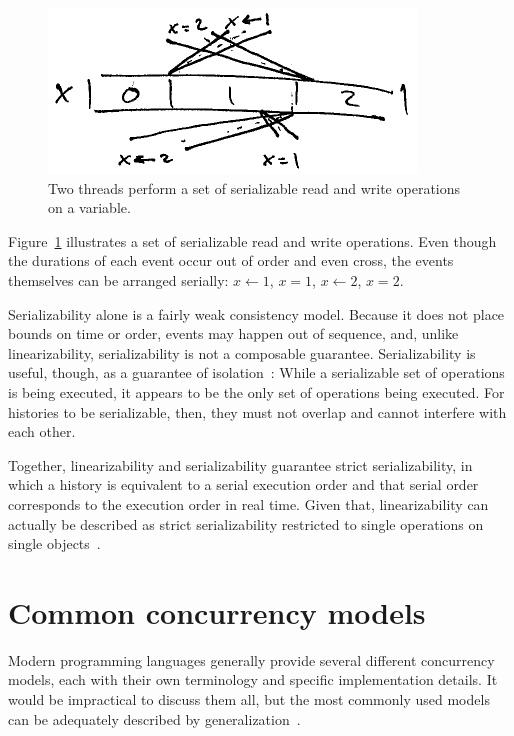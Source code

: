 \documentclass{sig-alternate}
\begin{document}
\begin{figure}[h]
  \centering
  \includegraphics{serializability}
  \caption{Two threads perform a set of serializable read and write operations on a variable.}
\label{figure:serializability}
\end{figure}

Figure~\ref{figure:serializability} illustrates a set of serializable read and write operations. Even though the durations of each event occur out of order and even cross, the events themselves can be arranged serially: $x \leftarrow 1$, $x = 1$, $x \leftarrow 2$, $x = 2$.

Serializability alone is a fairly weak consistency model. Because it does not place bounds on time or order, events may happen out of sequence, and, unlike linearizability, serializability is not a composable guarantee. Serializability is useful, though, as a guarantee of isolation~\cite{Haerder1983}: While a serializable set of operations is being executed, it appears to be the only set of operations being executed. For histories to be serializable, then, they must not overlap and cannot interfere with each other.

Together, linearizability and serializability guarantee strict serializability, in which a history is equivalent to a serial execution order and that serial order corresponds to the execution order in real time. Given that, linearizability can actually be described as strict serializability restricted to single operations on single objects~\cite{Herlihy1990}.

\section{Common concurrency models}

Modern programming languages generally provide several different concurrency models, each with their own terminology and specific implementation details. It would be impractical to discuss them all, but the most commonly used models can be adequately described by generalization~\cite{Swalens2014}.
\end{document}
